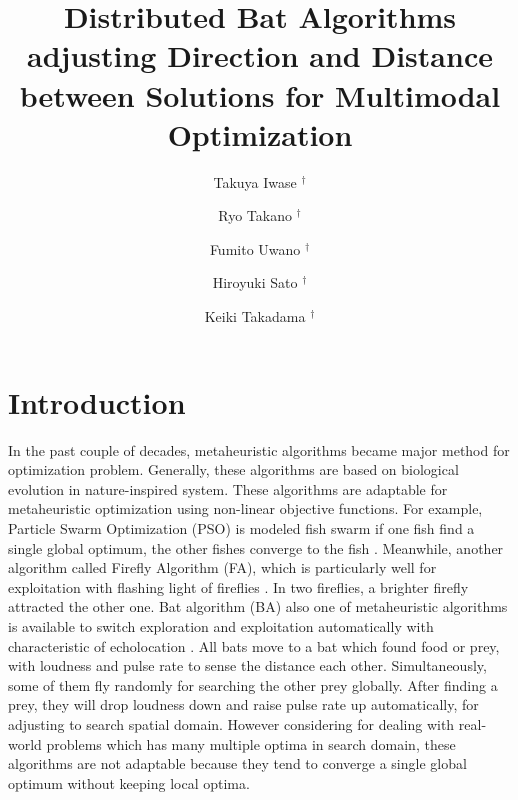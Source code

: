 \documentclass{ies2018}
\title{Distributed Bat Algorithms adjusting Direction and Distance between Solutions for Multimodal Optimization}
\author{Takuya Iwase $^{\dagger}$ \and Ryo Takano $^{\dagger}$ \and Fumito Uwano $^{\dagger}$ \and Hiroyuki Sato $^{\dagger}$ \and Keiki Takadama $^{\dagger}$}
\affiliation{%
    ${}^\dagger$ The University of Electro-Communications, Tokyo, Japan\\
}
\begin{document}
\maketitle

\section{Introduction}

In the past couple of decades, metaheuristic algorithms became major method for optimization problem. Generally, these algorithms are based on biological evolution in nature-inspired system. These algorithms are adaptable for metaheuristic optimization using non-linear objective functions. For example, Particle Swarm Optimization (PSO) is modeled fish swarm if one fish find a single global optimum, the other fishes converge to the fish \cite{PSO01}. Meanwhile, another algorithm called Firefly Algorithm (FA), which is particularly well for exploitation with flashing light of fireflies \cite{FA01}. In two fireflies, a brighter firefly attracted the other one. Bat algorithm (BA) also one of metaheuristic algorithms is available to switch exploration and exploitation automatically with characteristic of echolocation \cite{BA01}. All bats move to a bat which found food or prey, with loudness and pulse rate to sense the distance each other. Simultaneously, some of them fly randomly for searching the other prey globally. After finding a prey, they will drop loudness down and raise pulse rate up automatically, for adjusting to search spatial domain. However considering for dealing with real-world problems which has many multiple optima in search domain, these algorithms are not adaptable because they tend to converge a single global optimum without keeping local optima.
 
\end{document}
